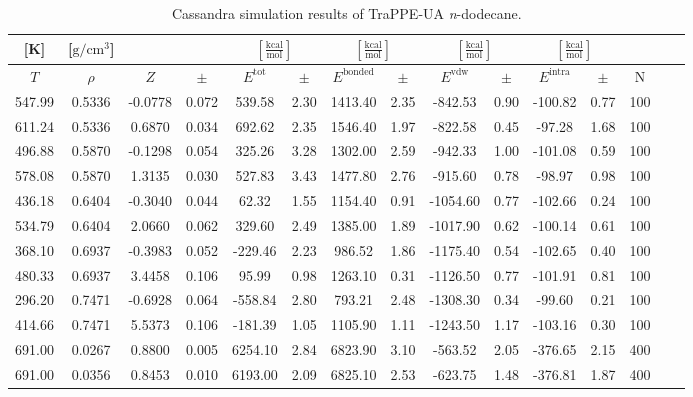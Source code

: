 \documentclass[%
 aip,
 jcp,
 sd,%
 amsmath,amssymb,
]{revtex4-1}
\begin{document}
\begin{table}[!htbp]
\centering
\caption{Cassandra simulation results of TraPPE-UA \textit{n}-dodecane.}
\label{tab:NIST-VAL-C12-FTT}
\begin{ruledtabular}
\begin{tabular}{ccccccccccccccc}
[K] & [$\mathrm{g/cm^3}$] &  &  & \multicolumn{2}{c}{$[\frac{\mathrm{kcal}}{\mathrm{mol}}]$} & \multicolumn{2}{c}{$[\frac{\mathrm{kcal}}{\mathrm{mol}}]$} & \multicolumn{2}{c}{$[\frac{\mathrm{kcal}}{\mathrm{mol}}]$} &\multicolumn{2}{c}{$[\frac{\mathrm{kcal}}{\mathrm{mol}}]$} & \\
\hline
$T$ & $\rho$ & $Z$ & $\pm$ & $E^{\mathrm{tot}}$ & $\pm$ & $E^{\mathrm{bonded}}$ & $\pm$ & $E^{\mathrm{vdw}}$ & $\pm$ & $E^{\mathrm{intra}}$ & $\pm$ & N\\
\hline
547.99 & 0.5336 & -0.0778 & 0.072 & 539.58  & 2.30 & 1413.40 & 2.35 & -842.53  & 0.90 & -100.82 & 0.77 & 100 \\
611.24 & 0.5336 & 0.6870  & 0.034 & 692.62  & 2.35 & 1546.40 & 1.97 & -822.58  & 0.45 & -97.28  & 1.68 & 100 \\
496.88 & 0.5870 & -0.1298 & 0.054 & 325.26  & 3.28 & 1302.00 & 2.59 & -942.33  & 1.00 & -101.08 & 0.59 & 100 \\
578.08 & 0.5870 & 1.3135  & 0.030 & 527.83  & 3.43 & 1477.80 & 2.76 & -915.60  & 0.78 & -98.97  & 0.98 & 100 \\
436.18 & 0.6404 & -0.3040 & 0.044 & 62.32   & 1.55 & 1154.40 & 0.91 & -1054.60 & 0.77 & -102.66 & 0.24 & 100 \\
534.79 & 0.6404 & 2.0660  & 0.062 & 329.60  & 2.49 & 1385.00 & 1.89 & -1017.90 & 0.62 & -100.14 & 0.61 & 100 \\
368.10 & 0.6937 & -0.3983 & 0.052 & -229.46 & 2.23 & 986.52  & 1.86 & -1175.40 & 0.54 & -102.65 & 0.40 & 100 \\
480.33 & 0.6937 & 3.4458  & 0.106 & 95.99   & 0.98 & 1263.10 & 0.31 & -1126.50 & 0.77 & -101.91 & 0.81 & 100 \\
296.20 & 0.7471 & -0.6928 & 0.064 & -558.84 & 2.80 & 793.21  & 2.48 & -1308.30 & 0.34 & -99.60  & 0.21 & 100 \\
414.66 & 0.7471 & 5.5373  & 0.106 & -181.39 & 1.05 & 1105.90 & 1.11 & -1243.50 & 1.17 & -103.16 & 0.30 & 100 \\
691.00 & 0.0267 & 0.8800  & 0.005 & 6254.10 & 2.84 & 6823.90 & 3.10 & -563.52  & 2.05 & -376.65 & 2.15 & 400 \\
691.00 & 0.0356 & 0.8453  & 0.010 & 6193.00 & 2.09 & 6825.10 & 2.53 & -623.75  & 1.48 & -376.81 & 1.87 & 400 \\

\end{tabular}
\end{ruledtabular}
\end{table}
\end{document}
